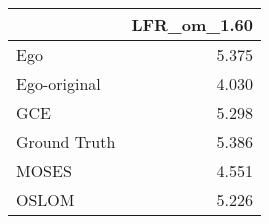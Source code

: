 \begin{tabular}{lr}
\toprule
{} & LFR_om_1.60 \\
\midrule
Ego          &       5.375 \\
Ego-original &       4.030 \\
GCE          &       5.298 \\
Ground Truth &       5.386 \\
MOSES        &       4.551 \\
OSLOM        &       5.226 \\
\bottomrule
\end{tabular}
